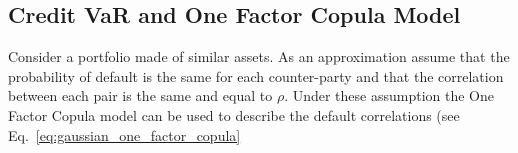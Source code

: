 %    
%
%
%
%
%
%
%  
%

\subsection{Credit VaR and One Factor Copula Model}
Consider a portfolio made of similar assets. As an approximation assume that the probability of default is the same for each counter-party and that the correlation between each pair is the same and equal to $\rho$. Under these assumption the One Factor Copula model can be used to describe the default correlations (see Eq.~\ref{eq:gaussian_one_factor_copula}

